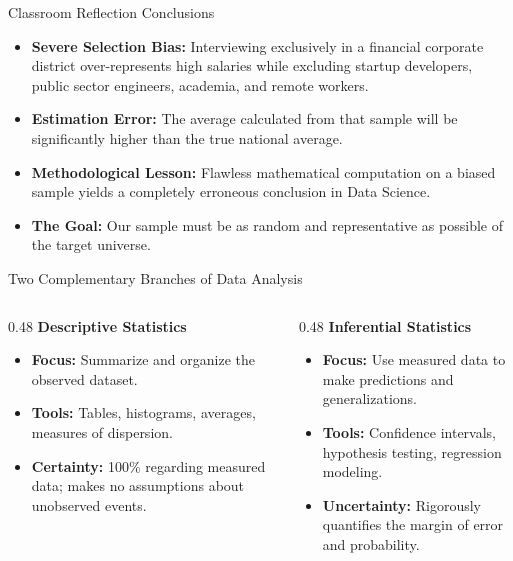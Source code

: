 \documentclass[aspectratio=169,xcolor={dvipsnames,table}]{beamer}
\begin{document}
\begin{frame}{Classroom Reflection Conclusions}
  \begin{itemize}
    \item \textbf{Severe Selection Bias:} Interviewing exclusively in a financial corporate district over-represents high salaries while excluding startup developers, public sector engineers, academia, and remote workers. \pause
    \item \textbf{Estimation Error:} The average calculated from that sample will be significantly higher than the true national average. \pause
    \item \textbf{Methodological Lesson:} Flawless mathematical computation on a biased sample yields a completely erroneous conclusion in Data Science. \pause
    \item \textbf{The Goal:} Our sample must be as random and representative as possible of the target universe.
  \end{itemize}
\end{frame}

\begin{frame}{Two Complementary Branches of Data Analysis}
  \begin{columns}[T]
    \begin{column}{0.48\textwidth}
      {\large \color{TecAzulOscuro}\textbf{Descriptive Statistics}}
      \vspace{0.3em}
      \begin{itemize}
        \item \textbf{Focus:} Summarize and organize the observed dataset. \pause
        \item \textbf{Tools:} Tables, histograms, averages, measures of dispersion. \pause
        \item \textbf{Certainty:} 100\% regarding measured data; makes no assumptions about unobserved events.
      \end{itemize}
    \end{column}
    
    \begin{column}{0.48\textwidth}
      {\large \color{TecRojo}\textbf{Inferential Statistics}}
      \vspace{0.3em}
      \begin{itemize}
        \item \textbf{Focus:} Use measured data to make predictions and generalizations. \pause
        \item \textbf{Tools:} Confidence intervals, hypothesis testing, regression modeling. \pause
        \item \textbf{Uncertainty:} Rigorously quantifies the margin of error and probability.
      \end{itemize}
    \end{column}
  \end{columns}
\end{frame}
\end{document}

